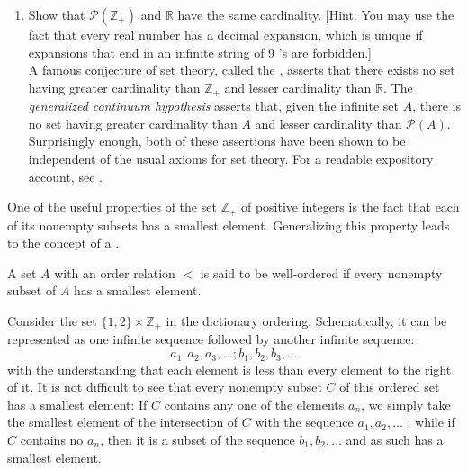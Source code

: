 \begin{enumerate}[itemsep=0.4em, parsep=0pt, topsep=0pt, partopsep=0pt, leftmargin=*, label=\arabic*., ref=\arabic*]
\item[*8.] Show that \(\mathcal{P}(\mathbb{Z}_{+})\) and \(\mathbb{R}\) have the same cardinality. [Hint: You may use the fact that every real number has a decimal expansion, which is unique if expansions that end in an infinite string of 9 's are forbidden.] \\A famous conjecture of set theory, called the , asserts that there exists no set having greater cardinality than \(\mathbb{Z}_{+}\) and lesser cardinality than \(\mathbb{R}\). The \textit{generalized continuum hypothesis} asserts that, given the infinite set \(A\), there is no set having greater cardinality than \(A\) and lesser cardinality than \(\mathcal{P}(A)\). Surprisingly enough, both of these assertions have been shown to be independent of the usual axioms for set theory. For a readable expository account, see \cite{Smullyan1969}.
\end{enumerate}


One of the useful properties of the set \(\mathbb{Z}_{+}\) of 
positive integers is the fact that each of its nonempty subsets has a 
smallest element. Generalizing this property leads to the concept of a .

\begin{definition}
 A set \(A\) with an order relation \(<\) is said to be well-ordered if every nonempty subset of \(A\) has a smallest element.
\end{definition}

\begin{centeredblock}
 \begin{example}
\label{ex:\thesection.\theexample}
 Consider the set \(\{1,2\} \times {\mathbb{Z}}_{+}\) in the dictionary ordering. Schematically, it can be represented as one infinite sequence followed by another infinite sequence:
 \[
 a_{1},a_{2},a_{3},\ldots ;b_{1},b_{2},b_{3},\ldots
 \]
 with the understanding that each element is less than every element to the right of it. It is not difficult to see that every nonempty subset \(C\) of this ordered set has a smallest element: If \(C\) contains any one of the elements \(a_{n}\), we simply take the smallest element of the intersection of \(C\) with the sequence \(a_{1},a_{2},\ldots\) ; while if \(C\) contains no \(a_{n}\), then it is a subset of the sequence \(b_{1},b_{2},\ldots\) and as such has a smallest element.
 \end{example}
\end{centeredblock}


